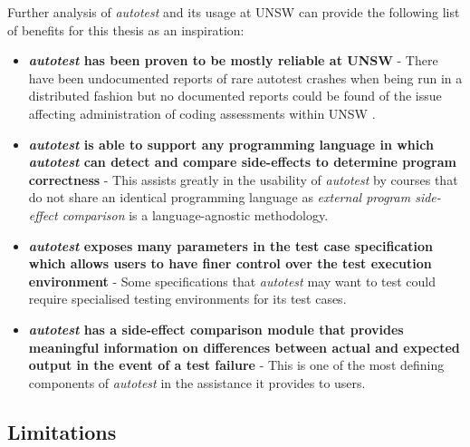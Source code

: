 \documentclass[hidelinks]{report}
\begin{document}
Further analysis of \textit{autotest} and its usage at UNSW can provide the following list of benefits for this thesis as an inspiration:
\begin{itemize}
	\item \textbf{\textit{autotest} has been proven to be mostly reliable at UNSW} - There have been undocumented reports of rare autotest crashes when being run in a distributed fashion but no documented reports could be found of the issue affecting administration of coding assessments within UNSW \cite{AutotestConversation}.
	\item \textbf{\textit{autotest} is able to support any programming language in which \textit{autotest} can detect and compare side-effects to determine program correctness} - This assists greatly in the usability of \textit{autotest} by courses that do not share an identical programming language as \textit{external program side-effect comparison} is a language-agnostic methodology.
	\item \textbf{\textit{autotest} exposes many parameters in the test case specification which allows users to have finer control over the test execution environment} - Some specifications that \textit{autotest} may want to test could require specialised testing environments for its test cases.
	\item \textbf{\textit{autotest} has a side-effect comparison module that provides meaningful information on differences between actual and expected output in the event of a test failure} - This is one of the most defining components of \textit{autotest} in the assistance it provides to users.
\end{itemize} 

\subsection{Limitations}\label{autotestLimitations}
\end{document}
